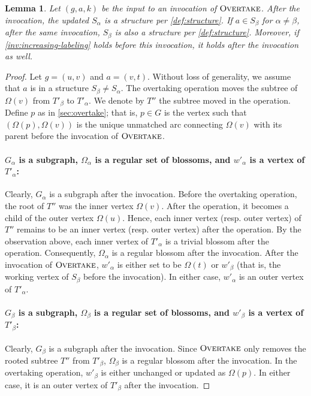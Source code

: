 \documentclass{article}
\newcommand{\alp}{\alpha}
\newcommand{\Omg}{\Omega}
\newcommand{\algOvertake}{\textsc{Overtake}\xspace}
\newtheorem{lemma}[theorem]{Lemma}
\begin{document}
\begin{lemma} \label{lem:appendix1} Let $(g, a, k)$ be the input to an invocation of $\algOvertake$.
After the invocation, the updated $S_\alp$ is a structure per \cref{def:structure}.
If $a \in S_\beta$ for $\alp \neq \beta$, after the same invocation, $S_\beta$ is
also a structure per \cref{def:structure}.
Moreover, if \cref{inv:increasing-labeling} holds before this invocation, it holds after the invocation as well.
\end{lemma}
\begin{proof}
Let $g = (u, v)$ and $a = (v, t)$.
Without loss of generality, we assume that $a$ is in a structure $S_\beta \neq S_\alp$.
The overtaking operation moves the subtree of $\Omg(v)$ from $T'_\beta$ to $T'_\alp$.
We denote by $T''$ the subtree moved in the operation.
Define $p$ as in \cref{sec:overtake};
that is, $p \in G$ is the vertex such that $(\Omg(p), \Omg(v))$ is the unique unmatched arc connecting $\Omg(v)$ with its parent before the invocation of $\algOvertake$.

\paragraph{$G_\alp$ is a subgraph, $\Omg_\alp$ is a regular set of blossoms, and $w'_\alp$ is a vertex of $T'_\alp$:}
Clearly, $G_\alp$ is a subgraph after the invocation.
Before the overtaking operation, the root of $T''$ was the inner vertex $\Omg(v)$.
After the operation, it becomes a child of the outer vertex $\Omg(u)$.
Hence, each inner vertex (resp. outer vertex) of $T''$ remains to be an inner vertex (resp. outer vertex) after the operation.
By the observation above, each inner vertex of $T'_\alp$ is a trivial blossom after the operation.
Consequently, $\Omg_\alp$ is a regular blossom after the invocation.
After the invocation of $\algOvertake$, $w'_\alp$ is either set to be $\Omg(t)$ or $w'_\beta$
(that is, the working vertex of $S_\beta$ before the invocation).
In either case, $w'_\alp$ is an outer vertex of $T'_\alp$.

\paragraph{$G_\beta$ is a subgraph, $\Omg_\beta$ is a regular set of blossoms, and $w'_\beta$ is a vertex of $T'_\beta$:}
Clearly, $G_\beta$ is a subgraph after the invocation.
Since $\algOvertake$ only removes the rooted subtree $T''$ from $T'_\beta$, $\Omg_\beta$ is a regular blossom after the invocation.
In the overtaking operation, $w'_\beta$ is either unchanged or updated as $\Omg(p)$.
In either case, it is an outer vertex of $T'_\beta$ after the invocation.


\end{proof}
\end{document}
